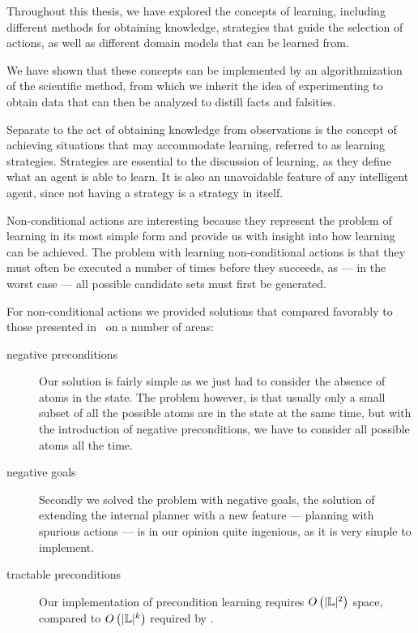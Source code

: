 \documentclass[Master.tex]{subfiles}
\begin{document}
Throughout this thesis, we have explored the concepts of learning, including different methods for obtaining knowledge, strategies that guide the selection of actions, as well as different domain models that can be learned from.

We have shown that these concepts can be implemented by an algorithmization of the scientific method, from which we inherit the idea of experimenting to obtain data that can then be analyzed to distill facts and falsities.

	Separate to the act of obtaining knowledge from observations is the concept of achieving situations that may accommodate learning, referred to as learning strategies.
	Strategies are essential to the discussion of learning, as they define what an agent is able to learn.
	It is also an unavoidable feature of any intelligent agent, since not having a strategy is a strategy in itself. 

	Non-conditional actions are interesting because they represent the problem of learning in its most simple form and provide us with insight into how learning can be achieved.
	The problem with learning non-conditional actions is that they must often be executed a number of times before they succeeds, as --- in the worst case --- all possible candidate sets must first be generated.
	
    For non-conditional actions we provided solutions that compared favorably to those presented in~\cite{Walsh2008} on a number of areas: 
\begin{description}
    \item[negative preconditions] Our solution is fairly simple as we just had to consider the absence of atoms in the state. The problem however, is that usually only a small subset of all the possible atoms are in the state at the same time, but with the introduction of negative preconditions, we have to consider all possible atoms all the time.
    \item[negative goals] Secondly we solved the problem with negative goals, the solution of extending the internal planner with a new feature --- planning with spurious actions --- is in our opinion quite ingenious, as it is very simple to implement. 
    \item[tractable preconditions] Our implementation of precondition learning requires $O\left(|\mathbb{L}|^2 \right)$ space, compared to $O\left(|\mathbb{L}|^k\right)$ required by \cite{Walsh2008}.
\end{description}
	
\end{document}
